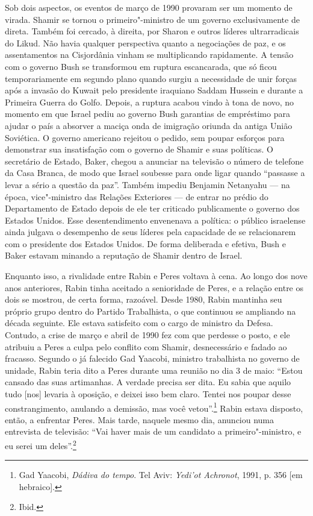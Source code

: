 Sob dois aspectos, os eventos de março de 1990 provaram ser um momento
de virada. Shamir se tornou o primeiro"-ministro de um governo
exclusivamente de direta. Também foi cercado, à direita, por Sharon e
outros líderes ultrarradicais do Likud. Não havia qualquer perspectiva
quanto a negociações de paz, e os assentamentos na Cisjordânia vinham se
multiplicando rapidamente. A tensão com o governo Bush se transformou em
ruptura escancarada, que só ficou temporariamente em segundo plano
quando surgiu a necessidade de unir forças após a invasão do Kuwait pelo
presidente iraquiano Saddam Hussein e durante a Primeira Guerra do
Golfo. Depois, a ruptura acabou vindo à tona de novo, no momento em que
Israel pediu ao governo Bush garantias de empréstimo para ajudar o país
a absorver a maciça onda de imigração oriunda da antiga União Soviética.
O governo americano rejeitou o pedido, sem poupar esforços para
demonstrar sua insatisfação com o governo de Shamir e suas políticas. O
secretário de Estado, Baker, chegou a anunciar na televisão o número de
telefone da Casa Branca, de modo que Israel soubesse para onde ligar
quando ``passasse a levar a sério a questão da paz''. Também impediu
Benjamin Netanyahu --- na época, vice"-ministro das Relações Exteriores ---
de entrar no prédio do Departamento de Estado depois de ele ter
criticado publicamente o governo dos Estados Unidos. Esse
desentendimento envenenava a política: o público israelense ainda
julgava o desempenho de seus líderes pela capacidade de se relacionarem
com o presidente dos Estados Unidos. De forma deliberada e efetiva, Bush
e Baker estavam minando a reputação de Shamir dentro de Israel.

Enquanto isso, a rivalidade entre Rabin e Peres voltava à cena. Ao longo
dos nove anos anteriores, Rabin tinha aceitado a senioridade de Peres, e
a relação entre os dois se mostrou, de certa forma, razoável. Desde
1980, Rabin mantinha seu próprio grupo dentro do Partido Trabalhista, o
que continuou se ampliando na década seguinte. Ele estava satisfeito com
o cargo de ministro da Defesa. Contudo, a crise de março e abril de 1990
fez com que perdesse o posto, e ele atribuiu a Peres a culpa pelo
conflito com Shamir, desnecessário e fadado ao fracasso. Segundo o já
falecido Gad Yaacobi, ministro trabalhista no governo de unidade, Rabin
teria dito a Peres durante uma reunião no dia 3 de maio: ``Estou cansado
das suas artimanhas. A verdade precisa ser dita. Eu sabia que aquilo
tudo {[}nos{]} levaria à oposição, e deixei isso bem claro. Tentei nos
poupar desse constrangimento, anulando a demissão, mas você
vetou''.\footnote{Gad Yaacobi, \emph{Dádiva do tempo}. Tel Aviv: \emph{Yedi'ot Achronot}, 1991, p. 356 {[}em
  hebraico{]}.} Rabin estava disposto, então, a enfrentar Peres. Mais
tarde, naquele mesmo dia, anunciou numa entrevista de televisão: ``Vai
haver mais de um candidato a primeiro"-ministro, e eu serei um
deles''.\footnote{Ibid.}

